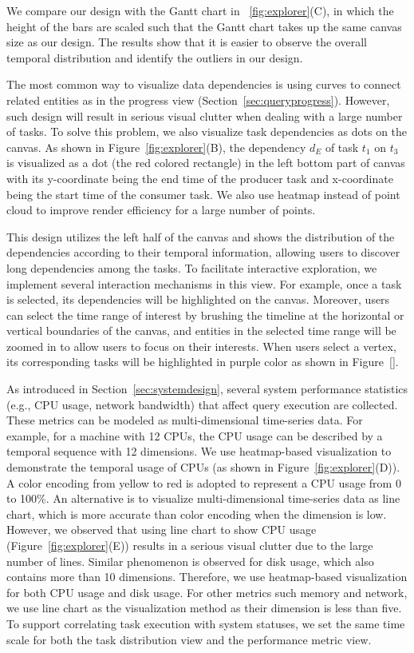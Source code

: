 We compare our design with the Gantt chart in ~\ref{fig:explorer}(C), in which the height of the bars are scaled such that the Gantt chart takes up the same canvas size as our design. The results show that it is easier to observe the overall temporal distribution and identify the outliers in our design.

The most common way to visualize data dependencies is using curves to connect related entities as in the progress view (Section~\ref{sec:queryprogress}). However, such design will result in serious visual clutter when dealing with a large number of tasks. To solve this problem, we also visualize task dependencies as dots on the canvas. As shown in Figure~\ref{fig:explorer}(B), the dependency $d_E$ of task $t_1$ on $t_3$ is visualized as a dot (the red colored rectangle) in the left bottom part of canvas with its y-coordinate being the end time of the producer task and x-coordinate being the start time of the consumer task. We also use heatmap instead of point cloud to improve render efficiency for a large number of points.

This design utilizes the left half of the canvas and shows the distribution of the dependencies according to their temporal information, allowing users to discover long dependencies among the tasks. To facilitate interactive exploration, we implement several interaction mechanisms in this view. For example, once a task is selected, its dependencies will be highlighted on the canvas. Moreover, users can select the time range of interest by brushing the timeline at the horizontal or vertical boundaries of the canvas, and entities in the selected time range will be zoomed in to allow users to focus on their interests. When users select a vertex, its corresponding tasks will be highlighted in purple color as shown in Figure~\ref{}.

As introduced in Section~\ref{sec:systemdesign}, several system performance statistics (e.g., CPU usage, network bandwidth) that affect query execution are collected. These metrics can be modeled as multi-dimensional time-series data. For example, for a machine with 12 CPUs, the CPU usage can be described by a temporal sequence with 12 dimensions. We use heatmap-based visualization to demonstrate the temporal usage of CPUs (as shown in Figure~\ref{fig:explorer}(D)). A color encoding from yellow to red is adopted to represent a CPU usage from 0 to 100$\%$. An alternative is to visualize multi-dimensional time-series data as line chart, which is more accurate than color encoding when the dimension is low. However, we observed that using line chart to show CPU usage (Figure~\ref{fig:explorer}(E)) results in a serious visual clutter due to the large number of lines. Similar phenomenon is observed for disk usage, which also contains more than 10 dimensions. Therefore, we use heatmap-based visualization for both CPU usage and disk usage. For other metrics such memory and network, we use line chart as the visualization method as their dimension is less than five. To support correlating task execution with system statuses, we set the same time scale for both the task distribution view and the performance metric view.


